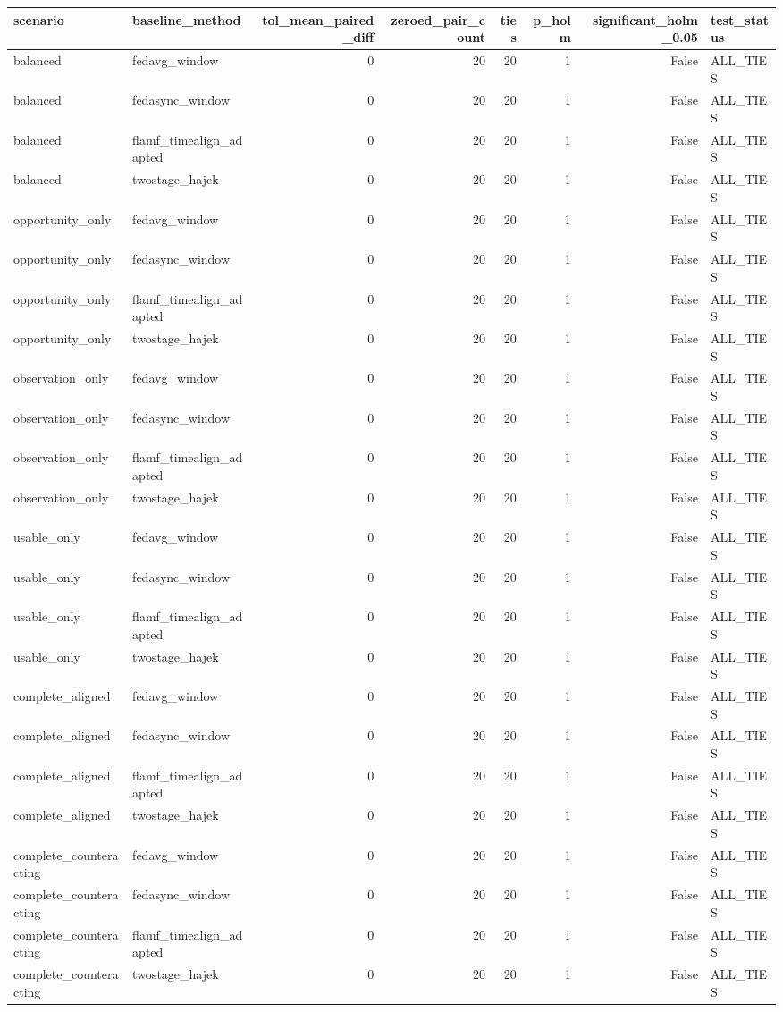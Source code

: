 \begin{tabular}{llrrrrrl}
\toprule
scenario & baseline_method & tol_mean_paired_diff & zeroed_pair_count & ties & p_holm & significant_holm_0.05 & test_status \\
\midrule
balanced & fedavg_window & 0 & 20 & 20 & 1 & False & ALL_TIES \\
balanced & fedasync_window & 0 & 20 & 20 & 1 & False & ALL_TIES \\
balanced & flamf_timealign_adapted & 0 & 20 & 20 & 1 & False & ALL_TIES \\
balanced & twostage_hajek & 0 & 20 & 20 & 1 & False & ALL_TIES \\
opportunity_only & fedavg_window & 0 & 20 & 20 & 1 & False & ALL_TIES \\
opportunity_only & fedasync_window & 0 & 20 & 20 & 1 & False & ALL_TIES \\
opportunity_only & flamf_timealign_adapted & 0 & 20 & 20 & 1 & False & ALL_TIES \\
opportunity_only & twostage_hajek & 0 & 20 & 20 & 1 & False & ALL_TIES \\
observation_only & fedavg_window & 0 & 20 & 20 & 1 & False & ALL_TIES \\
observation_only & fedasync_window & 0 & 20 & 20 & 1 & False & ALL_TIES \\
observation_only & flamf_timealign_adapted & 0 & 20 & 20 & 1 & False & ALL_TIES \\
observation_only & twostage_hajek & 0 & 20 & 20 & 1 & False & ALL_TIES \\
usable_only & fedavg_window & 0 & 20 & 20 & 1 & False & ALL_TIES \\
usable_only & fedasync_window & 0 & 20 & 20 & 1 & False & ALL_TIES \\
usable_only & flamf_timealign_adapted & 0 & 20 & 20 & 1 & False & ALL_TIES \\
usable_only & twostage_hajek & 0 & 20 & 20 & 1 & False & ALL_TIES \\
complete_aligned & fedavg_window & 0 & 20 & 20 & 1 & False & ALL_TIES \\
complete_aligned & fedasync_window & 0 & 20 & 20 & 1 & False & ALL_TIES \\
complete_aligned & flamf_timealign_adapted & 0 & 20 & 20 & 1 & False & ALL_TIES \\
complete_aligned & twostage_hajek & 0 & 20 & 20 & 1 & False & ALL_TIES \\
complete_counteracting & fedavg_window & 0 & 20 & 20 & 1 & False & ALL_TIES \\
complete_counteracting & fedasync_window & 0 & 20 & 20 & 1 & False & ALL_TIES \\
complete_counteracting & flamf_timealign_adapted & 0 & 20 & 20 & 1 & False & ALL_TIES \\
complete_counteracting & twostage_hajek & 0 & 20 & 20 & 1 & False & ALL_TIES \\
\bottomrule
\end{tabular}
